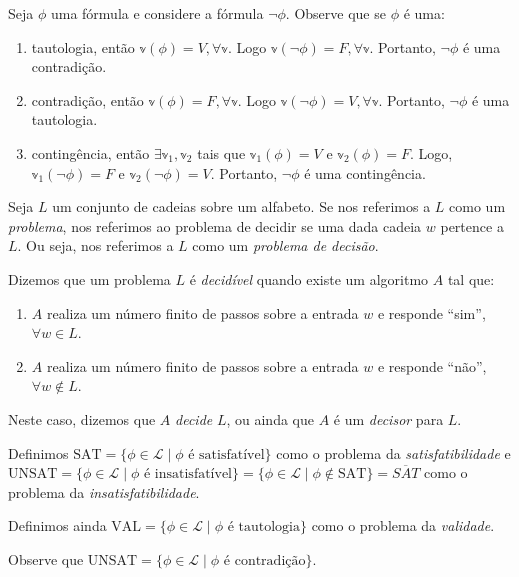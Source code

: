 \begin{observation}
	\label{negacoes}
	Seja $\phi$ uma fórmula e considere a fórmula $\neg \phi$. Observe que se $\phi$ é uma:
	\begin{enumerate}
		\item tautologia, então $\mathbb{v}(\phi) = V, \forall \mathbb{v}$. Logo $\mathbb{v}(\neg \phi) = F, \forall \mathbb{v}$. Portanto, $\neg \phi$ é uma contradição.
		\item contradição, então $\mathbb{v}(\phi) = F, \forall \mathbb{v}$. Logo $\mathbb{v}(\neg \phi) = V, \forall \mathbb{v}$. Portanto, $\neg \phi$ é uma tautologia.
		\item contingência, então $\exists \mathbb{v}_1,\mathbb{v}_2$ tais que $\mathbb{v}_1(\phi) = V$ e $\mathbb{v}_2(\phi) = F$. Logo, $\mathbb{v}_1(\neg \phi) = F$ e $\mathbb{v}_2(\neg \phi) = V$. Portanto, $\neg \phi$ é uma contingência.
	\end{enumerate}
\end{observation}

\begin{definition}
	Seja $L$ um conjunto de cadeias sobre um alfabeto. Se nos referimos a $L$ como um \emph{problema}, nos referimos ao problema de decidir se uma dada cadeia $w$ pertence a $L$. Ou seja, nos referimos a $L$ como um \emph{problema de decisão}.
	
	Dizemos que um problema $L$ é \emph{decidível} quando existe um algoritmo $A$ tal que:
	\begin{enumerate}
		\item $A$ realiza um número finito de passos sobre a entrada $w$ e responde ``sim'', $\forall w \in L$.
		\item $A$ realiza um número finito de passos sobre a entrada $w$ e responde ``não'', $\forall w \notin L$.
	\end{enumerate}
	Neste caso, dizemos que $A$ \emph{decide} $L$, ou ainda que $A$ é um \emph{decisor} para $L$.
\end{definition}

\begin{definition}
	Definimos $\text{SAT} = \{\phi \in \mathcal{L} \mid \phi \text{ é satisfatível} \}$ como o problema da \emph{satisfatibilidade} e $\text{UNSAT} = \{\phi \in \mathcal{L} \mid \phi \text{ é insatisfatível} \} = \{\phi \in \mathcal{L} \mid \phi \notin \text{SAT} \} = \overline{SAT}$ como o problema da \emph{insatisfatibilidade}.
	
	Definimos ainda $\text{VAL} = \{\phi \in \mathcal{L} \mid \phi \text{ é tautologia} \}$ como o problema da \emph{validade}.
	
	Observe que $\text{UNSAT} = \{\phi \in \mathcal{L} \mid \phi \text{ é contradição} \}$.
\end{definition}

